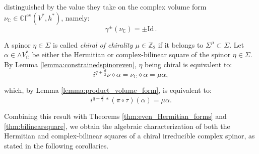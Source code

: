 \documentclass[10pt,a4paper,twoside,reqno]{amsart}
\theoremstyle{plain}
\theoremstyle{definition}
\theoremstyle{remark}
\def\C{\mathbb{C}}
\def\Id{\mathrm{Id}}
\begin{document}
\noindent
distinguished by the value they take on the complex volume form $\nu_\C \in \C \mathrm{l}^{\mathrm{ev}}(V^*,h^*)$, namely: 
\begin{equation*}
\gamma^\pm(\nu_\C)=\pm\Id\, .    
\end{equation*}
 
\noindent
A spinor $\eta\in\Sigma$ is called \emph{chiral of chirality $\mu\in\mathbb{Z}_2$} if it belongs to $\Sigma^\mu\subset\Sigma$. Let $\alpha\in\wedge V^*_\C$ be either the Hermitian or complex-bilinear square of the spinor $\eta\in\Sigma$. By Lemma \ref{lemma:constrainedspinoreven}, $\eta$ being chiral is equivalent to:
\begin{equation*}
 i^{q + \frac{d}{2}}\nu\diamond\alpha=\nu_\C\diamond\alpha=\mu\alpha,
\end{equation*}

\noindent
which, by Lemma \ref{lemma:product_volume_form}, is equivalent to: 
\begin{equation*}
i^{q + \frac{d}{2}}*(\pi\circ\tau)(\alpha)=\mu\alpha.
\end{equation*}

\noindent
Combining this result with Theorems \ref{thm:even_Hermitian_forms} and \ref{thm:bilinearsquare}, we obtain the algebraic characterization of both the Hermitian and complex-bilinear squares of a chiral irreducible complex spinor, as stated in the following corollaries.
\end{document}
